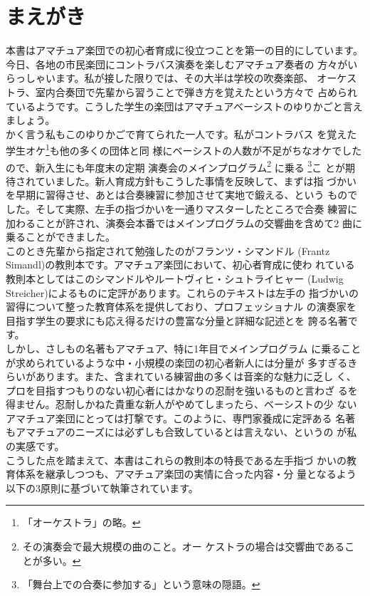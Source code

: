 \section*{まえがき}
本書はアマチュア楽団での初心者育成に役立つことを第一の目的にしています。\\
\indent 今日、各地の市民楽団にコントラバス演奏を楽しむアマチュア奏者の
方々がいらっしゃいます。私が接した限りでは、その大半は学校の吹奏楽部、
オーケストラ、室内合奏団で先輩から習うことで弾き方を覚えたという方々で
占められているようです。こうした学生の楽団はアマチュアベーシストのゆりかごと言えましょう。\\
\indent かく言う私もこのゆりかごで育てられた一人です。私がコントラバス
を覚えた学生オケ\footnote{「オーケストラ」の略。}も他の多くの団体と同
様にベーシストの人数が不足がちなオケでしたので、新入生にも年度末の定期
演奏会のメインプログラム\footnote {その演奏会で最大規模の曲のこと。オー
ケストラの場合は交響曲であることが多い。} に乗る
\footnote{「舞台上での合奏に参加する」という意味の隠語。}こ
とが期待されていました。新人育成方針もこうした事情を反映して、まずは指
づかいを早期に習得させ、あとは合奏練習に参加させて実地で鍛える、という
ものでした。そして実際、左手の指づかいを一通りマスターしたところで合奏
練習に加わることが許され、演奏会本番ではメインプログラムの交響曲を含めて2
曲に乗ることができました。\\
\indent このとき先輩から指定されて勉強したのがフランツ・シマンドル
(Frantz Simandl)の教則本です。アマチュア楽団において、初心者育成に使わ
れている教則本としてはこのシマンドルやルートヴィヒ・シュトライヒャー
(Ludwig Streicher)によるものに定評があります。これらのテキストは左手の
指づかいの習得について整った教育体系を提供しており、プロフェッショナル
の演奏家を目指す学生の要求にも応え得るだけの豊富な分量と詳細な記述とを
誇る名著です。\\
\indent しかし、さしもの名著もアマチュア、特に1年目でメインプログラム
に乗ることが求められているような中・小規模の楽団の初心者新人には分量が
多すぎるきらいがあります。また、含まれている練習曲の多くは音楽的な魅力に乏し
く、プロを目指すつもりのない初心者にはかなりの忍耐を強いるものと言わざ
るを得ません。忍耐しかねた貴重な新人がやめてしまったら、ベーシストの少
ないアマチュア楽団にとっては打撃です。このように、専門家養成に定評ある
名著もアマチュアのニーズには必ずしも合致しているとは言えない、というの
が私の実感です。\\
\indent こうした点を踏まえて、本書はこれらの教則本の特長である左手指づ
かいの教育体系を継承しつつも、アマチュア楽団の実情に合った内容・分
量となるよう以下の3原則に基づいて執筆されています。

